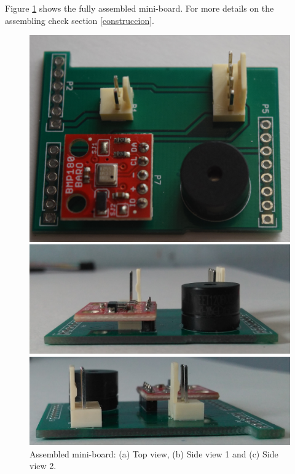 \documentclass[12pt,letterpaper]{article}
\numberwithin{figure}{section}
\numberwithin{equation}{section}
\numberwithin{table}{section}
\begin{document}
Figure \ref{fig:18} shows the fully assembled mini-board. For more details on the assembling check section \ref{construccion}.

\begin{figure}[H]
    \centering
    \begin{minipage}{.45\textwidth}
    \centering
    \includegraphics[width=\linewidth]{Figuras/figure_18_a.jpg}
    \end{minipage}
    \centering
    \begin{minipage}{.45\textwidth}
    \centering
    \includegraphics[width=\linewidth]{Figuras/figure_18_b.jpg}
    \end{minipage}
    \centering
    \begin{minipage}{.45\textwidth}
    \centering
    \includegraphics[width=\linewidth]{Figuras/figure_18_c.jpg}
    \end{minipage}
    
    \caption{Assembled mini-board: (a) Top view, (b) Side view 1 and (c) Side view 2.}
    \label{fig:18}
\end{figure}
\end{document}
